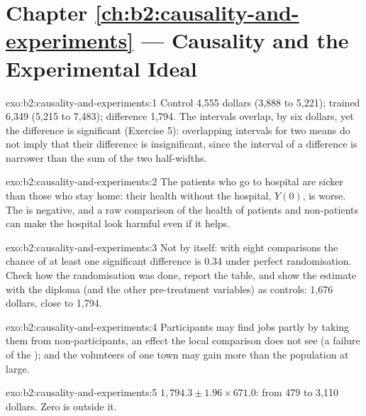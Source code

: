 \section*{Chapter \ref{ch:b2:causality-and-experiments} --- Causality and the Experimental Ideal}

\begin{solution}{exo:b2:causality-and-experiments:1}
Control 4,555 dollars (3,888 to 5,221); trained 6,349 (5,215 to 7,483); difference 1,794. The intervals overlap, by six
dollars, yet the difference is significant (Exercise 5): overlapping intervals for two means do not imply that their
difference is insignificant, since the interval of a difference is narrower than the sum of the two half-widths.
\end{solution}

\begin{solution}{exo:b2:causality-and-experiments:2}
The patients who go to hospital are sicker than those who stay home: their health without the hospital, $Y(0)$, is worse.
The  is negative, and a raw comparison of the health of patients and non-patients can make the hospital look
harmful even if it helps.
\end{solution}

\begin{solution}{exo:b2:causality-and-experiments:3}
Not by itself: with eight comparisons the chance of at least one significant difference is 0.34 under perfect
randomisation. Check how the randomisation was done, report the table, and show the estimate with the diploma (and the
other pre-treatment variables) as controls: 1,676 dollars, close to 1,794.
\end{solution}

\begin{solution}{exo:b2:causality-and-experiments:4}
Participants may find jobs partly by taking them from non-participants, an effect the local comparison does not see (a
failure of the ); and the volunteers of one town may gain more than the population
at large.
\end{solution}

\begin{solution}{exo:b2:causality-and-experiments:5}
$1{,}794.3 \pm 1.96 \times 671.0$: from 479 to 3,110 dollars. Zero is outside it.
\end{solution}

